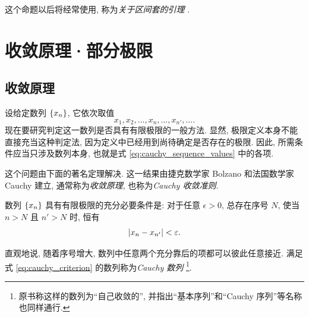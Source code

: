 这个命题以后将经常使用, 称为\emph{关于区间套的引理}
.

\section{收敛原理·部分极限}\label{sec:convergence_principle_partial_limits}
\subsection{收敛原理}\label{subsec:39}
设给定数列 $\{x_{n}\}$, 它依次取值
\begin{equation}\label{eq:cauchy_sequence_values}
x_1,x_2,\ldots,x_n,\ldots,x_{n'},\ldots.
\end{equation}
现在要研究判定这一数列是否具有有限极限的一般方法.
显然, 极限定义本身不能直接充当这种判定法, 因为定义中已经用到尚待确定是否存在的极限.
因此, 所需条件应当只涉及数列本身, 也就是式 \eqref{eq:cauchy_sequence_values} 中的各项.

这个问题由下面的著名定理解决.
这一结果由捷克数学家 Bolzano 和法国数学家 Cauchy 建立,
通常称为\emph{收敛原理},
也称为\emph{Cauchy 收敛准则}.

\begin{theorem}\label{thm:cauchy_convergence_criterion}
数列 $\{x_{n}\}$ 具有有限极限的充分必要条件是:
对于任意 $\epsilon>0$, 总存在序号 $N$, 使当 $n>N$ 且 $n'>N$ 时,
恒有
\begin{equation}\label{eq:cauchy_criterion}
\left| x_n-x_{n'} \right|<\varepsilon.
\end{equation}
\end{theorem}

直观地说, 随着序号增大, 数列中任意两个充分靠后的项都可以彼此任意接近.
满足式 \eqref{eq:cauchy_criterion} 的数列称为\emph{Cauchy 数列}
\footnote{原书称这样的数列为“自己收敛的”, 并指出“基本序列”和“Cauchy 序列”等名称也同样通行.}.

